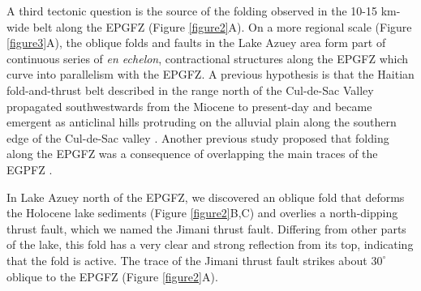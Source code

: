\documentclass[man,natbib]{apa6}
\begin{document}
A third tectonic question is the source of the folding observed in the 10-15 km-wide belt along the EPGFZ (Figure \ref{figure2}A). On a more regional scale (Figure \ref{figure3}A), the oblique folds and faults in the Lake Azuey area form part of continuous series of \textit{en echelon}, contractional structures along the EPGFZ which curve into parallelism with the EPGFZ. A previous hypothesis is that the Haitian fold-and-thrust belt described in the range north of the Cul-de-Sac Valley \citep{pubellier2000plate} propagated southwestwards from the Miocene to present-day and became emergent as anticlinal hills protruding on the alluvial plain along the southern edge of the Cul-de-Sac valley \citep{calais2010transpressional}. Another previous study proposed that folding along the EPGFZ was a consequence of overlapping the main traces of the EGPFZ \citep{cowgill2012interactive}. 

In Lake Azuey north of the EPGFZ, we discovered an oblique fold that deforms the Holocene lake sediments (Figure \ref{figure2}B,C) and overlies a north-dipping thrust fault, which we named the Jimani thrust fault. Differing from other parts of the lake, this fold has a very clear and strong reflection from its top, indicating that the fold is active. The trace of the Jimani thrust fault strikes about $30^{\circ}$ oblique to the EPGFZ (Figure \ref{figure2}A). 
\end{document}
